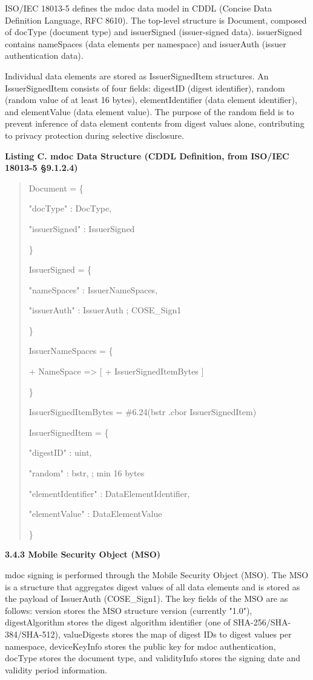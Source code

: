 ISO/IEC 18013-5 defines the mdoc data model in CDDL (Concise Data Definition Language, RFC 8610). The top-level structure is Document, composed of docType (document type) and issuerSigned (issuer-signed data). issuerSigned contains nameSpaces (data elements per namespace) and issuerAuth (issuer authentication data).

Individual data elements are stored as IssuerSignedItem structures. An IssuerSignedItem consists of four fields: digestID (digest identifier), random (random value of at least 16 bytes), elementIdentifier (data element identifier), and elementValue (data element value). The purpose of the random field is to prevent inference of data element contents from digest values alone, contributing to privacy protection during selective disclosure.

\textbf{Listing C. mdoc Data Structure (CDDL Definition, from ISO/IEC 18013-5 §9.1.2.4)}

\begin{quote}
Document = \{

"docType" : DocType,

"issuerSigned" : IssuerSigned

\}

IssuerSigned = \{

"nameSpaces" : IssuerNameSpaces,

"issuerAuth" : IssuerAuth ; COSE\_Sign1

\}

IssuerNameSpaces = \{

+ NameSpace =\textgreater{} {[} + IssuerSignedItemBytes {]}

\}

IssuerSignedItemBytes = \#6.24(bstr .cbor IssuerSignedItem)

IssuerSignedItem = \{

"digestID" : uint,

"random" : bstr, ; min 16 bytes

"elementIdentifier" : DataElementIdentifier,

"elementValue" : DataElementValue

\}
\end{quote}

\textbf{3.4.3 Mobile Security Object (MSO)}

mdoc signing is performed through the Mobile Security Object (MSO). The MSO is a structure that aggregates digest values of all data elements and is stored as the payload of IssuerAuth (COSE\_Sign1). The key fields of the MSO are as follows: version stores the MSO structure version (currently "1.0"), digestAlgorithm stores the digest algorithm identifier (one of SHA-256/SHA-384/SHA-512), valueDigests stores the map of digest IDs to digest values per namespace, deviceKeyInfo stores the public key for mdoc authentication, docType stores the document type, and validityInfo stores the signing date and validity period information.


